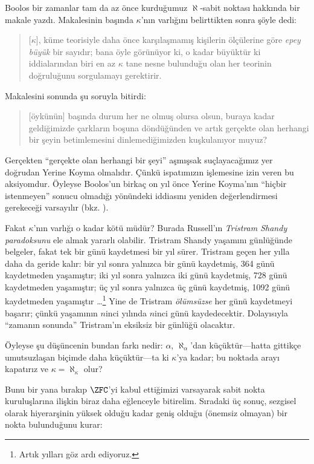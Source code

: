 Boolos bir zamanlar tam da az önce kurduğumuz $\aleph$-sabit noktası
hakkında bir makale yazdı. Makalesinin başında $\kappa$'nın varlığını
belirttikten sonra şöyle dedi:
\begin{quote}
	[$\kappa$], küme teorisiyle daha önce karşılaşmamış kişilerin ölçülerine
	göre \emph{epey büyük} bir sayıdır; bana öyle görünüyor ki, o kadar
	büyüktür ki iddialarından biri en az $\kappa$ tane nesne bulunduğu olan
	her teorinin doğruluğunu sorgulamayı gerektirir.
	\citep[p.~257]{Boolos2000}
\end{quote}
Makalesini sonunda şu soruyla bitirdi:
\begin{quote}
	[öykünün] başında durum her ne olmuş olursa olsun, buraya kadar
	geldiğimizde çarkların boşuna döndüğünden ve artık gerçekte olan herhangi
	bir şeyin betimlemesini dinlemediğimizden kuşkulanıyor muyuz?
	\citep[p.~268]{Boolos2000}
\end{quote}
Gerçekten ``gerçekte olan herhangi bir şeyi'' aşmışsak suçlayacağımız yer
doğrudan Yerine Koyma olmalıdır. Çünkü ispatımızın işlemesine izin veren bu
aksiyomdur. Öyleyse Boolos'un birkaç on yıl önce Yerine Koyma'nın ``hiçbir
istenmeyen'' sonucu olmadığı yönündeki iddiasını yeniden değerlendirmesi
gerekeceği varsayılır (bkz. ).

Fakat $\kappa$'nın varlığı o kadar kötü müdür? Burada Russell'ın
\emph{Tristram Shandy paradoksunu} ele almak yararlı olabilir. Tristram
Shandy yaşamını günlüğünde belgeler, fakat tek bir günü kaydetmesi bir yıl
sürer. Tristram geçen her yılla daha da geride kalır: bir yıl sonra yalnızca
bir günü kaydetmiş, 364 günü kaydetmeden yaşamıştır; iki yıl sonra yalnızca
iki günü kaydetmiş, 728 günü kaydetmeden yaşamıştır; üç yıl sonra yalnızca
üç günü kaydetmiş, 1092 günü kaydetmeden yaşamıştır
\dots\footnote{Artık yılları göz ardı ediyoruz.} Yine de Tristram
\emph{ölümsüzse} her günü kaydetmeyi başarır; çünkü yaşamının $n$inci
yılında $n$inci günü kaydedecektir. Dolayısıyla ``zamanın sonunda''
Tristram'ın eksiksiz bir günlüğü olacaktır.

Öyleyse şu düşüncenin bundan farkı nedir: $\alpha$, $\aleph_\alpha$'dan
küçüktür---hatta gittikçe umutsuzlaşan biçimde daha küçüktür---ta ki
$\kappa$'ya kadar; bu noktada arayı kapatırız ve
$\kappa=\aleph_\kappa$ olur?

Bunu bir yana bırakıp $\ZFC$'yi kabul ettiğimizi varsayarak sabit nokta
kuruluşlarına ilişkin biraz daha eğlenceyle bitirelim. Sıradaki üç sonuç,
sezgisel olarak hiyerarşinin yüksek olduğu kadar geniş olduğu (önemsiz
olmayan) bir nokta bulunduğunu kurar:


